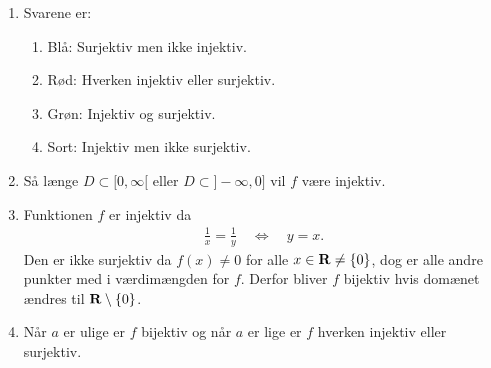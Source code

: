 \begin{enumerate}
	\item \label{it:fun1} Svarene er:
	\begin{enumerate}
		\item Blå: Surjektiv men ikke injektiv.
		\item Rød: Hverken injektiv eller surjektiv.
		\item Grøn: Injektiv og surjektiv.
		\item Sort: Injektiv men ikke surjektiv.
	\end{enumerate}

	\item Så længe $D\subset [0,\infty[$ eller $D\subset ]-\infty,0]$ vil $f$ være injektiv.
	
	\item \label{it:fun2} Funktionen $f$ er injektiv da 
	\begin{align*}
	\frac{1}{x}=\frac{1}{y}\quad\Leftrightarrow\quad y=x.
	\end{align*}
	Den er ikke surjektiv da $f(x)\neq 0$ for alle $x\in \mathbf{R}\neq \{0\}$, dog er alle andre punkter med i værdimængden for $f$. Derfor bliver $f$ bijektiv hvis domænet ændres til $\mathbf{R}\setminus\{0\}$.
	

	\item Når $a$ er ulige er $f$ bijektiv og når $a$ er lige er $f$ hverken injektiv eller surjektiv.
	

\end{enumerate}
